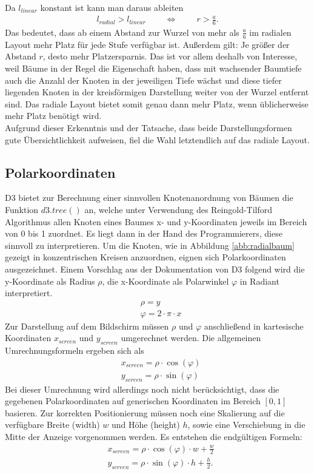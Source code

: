 Da $l_{linear}$ konstant ist kann man daraus ableiten
\begin{align*}
l_{radial} > l_{linear} \mspace{40mu} \Leftrightarrow  \mspace{40mu} r > \frac{a}{6}.
\end{align*}
Das bedeutet, dass ab einem Abstand zur Wurzel von mehr als $\frac{a}{6}$ im radialen Layout mehr Platz für jede Stufe verfügbar ist. Außerdem gilt: Je größer der Abstand $r$, desto mehr Platzersparnis. Das ist vor allem deshalb von Interesse, weil Bäume in der Regel die Eigenschaft haben, dass mit wachsender Baumtiefe auch die Anzahl der Knoten in der jeweiligen Tiefe wächst und diese tiefer liegenden Knoten in der kreisförmigen Darstellung weiter von der Wurzel entfernt sind. Das radiale Layout bietet somit genau dann mehr Platz, wenn üblicherweise mehr Platz benötigt wird.\\
Aufgrund dieser Erkenntnis und der Tatsache, dass beide Darstellungsformen gute Übersichtlichkeit aufweisen, fiel die Wahl letztendlich auf das radiale Layout.

\subsection{Polarkoordinaten}
D3 bietet zur Berechnung einer sinnvollen Knotenanordnung von Bäumen die Funktion $d3.tree()$ an, welche unter Verwendung des Reingold-Tilford Algorithmus  allen Knoten eines Baumes x- und y-Koordinaten jeweils im Bereich von 0 bis 1 zuordnet. Es liegt dann in der Hand des Programmierers, diese sinnvoll zu interpretieren. Um die Knoten, wie in Abbildung \ref{abb:radialbaum} gezeigt in konzentrischen Kreisen anzuordnen, eignen sich Polarkoordinaten ausgezeichnet. Einem Vorschlag aus der Dokumentation von D3 folgend  wird die y-Koordinate als Radius $\rho$, die x-Koordinate als Polarwinkel $\varphi$ in Radiant interpretiert. 
\begin{align*}
&\rho = y\\
&\varphi = 2 \cdot \pi \cdot x
\end{align*}
Zur Darstellung auf dem Bildschirm müssen $\rho$ und $\varphi$ anschließend in kartesische Koordinaten $x_{screen}$ und $y_{screen}$ umgerechnet werden. Die allgemeinen Umrechnungsformeln ergeben sich als
\begin{align*}
&x_{screen} = \rho \cdot \cos (\varphi)\\
&y_{screen} = \rho \cdot \sin (\varphi)
\end{align*}
Bei dieser Umrechnung wird allerdings noch nicht berücksichtigt, dass die gegebenen Polarkoordinaten auf generischen Koordinaten im Bereich $[0,1]$ basieren. Zur korrekten Positionierung müssen noch eine Skalierung auf die verfügbare Breite (width) $w$ und Höhe (height) $h$, sowie eine Verschiebung in die Mitte der Anzeige vorgenommen werden. Es entstehen die endgültigen Formeln:
\begin{align}
&x_{screen} = \rho \cdot \cos (\varphi) \cdot w + \frac{w}{2} \label{eq:polkarthx}\\
&y_{screen} = \rho \cdot \sin (\varphi) \cdot h + \frac{h}{2}.\label{eq:polkarthy}
\end{align}


